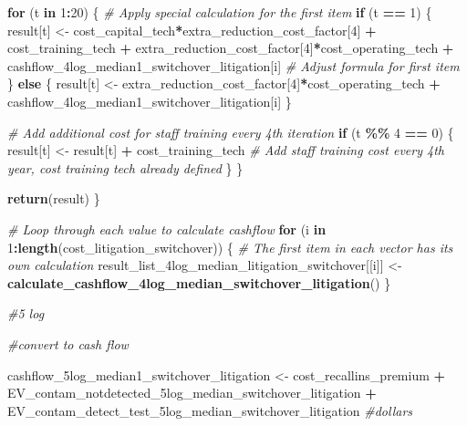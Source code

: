 \documentclass[
]{article}
\newenvironment{Shaded}{\begin{snugshade}}{\end{snugshade}}
\newcommand{\CommentTok}[1]{\textcolor[rgb]{0.56,0.35,0.01}{\textit{#1}}}
\newcommand{\ControlFlowTok}[1]{\textcolor[rgb]{0.13,0.29,0.53}{\textbf{#1}}}
\newcommand{\DecValTok}[1]{\textcolor[rgb]{0.00,0.00,0.81}{#1}}
\newcommand{\FunctionTok}[1]{\textcolor[rgb]{0.13,0.29,0.53}{\textbf{#1}}}
\newcommand{\NormalTok}[1]{#1}
\newcommand{\OtherTok}[1]{\textcolor[rgb]{0.56,0.35,0.01}{#1}}
\newcommand{\SpecialCharTok}[1]{\textcolor[rgb]{0.81,0.36,0.00}{\textbf{#1}}}
\begin{document}
\begin{Shaded}
\begin{Highlighting}[]
  \ControlFlowTok{for}\NormalTok{ (t }\ControlFlowTok{in} \DecValTok{1}\SpecialCharTok{:}\DecValTok{20}\NormalTok{) \{}
    \CommentTok{\# Apply special calculation for the first item}
    \ControlFlowTok{if}\NormalTok{ (t }\SpecialCharTok{==} \DecValTok{1}\NormalTok{) \{}
\NormalTok{      result[t] }\OtherTok{\textless{}{-}}\NormalTok{ cost\_capital\_tech}\SpecialCharTok{*}\NormalTok{extra\_reduction\_cost\_factor[}\DecValTok{4}\NormalTok{] }\SpecialCharTok{+}\NormalTok{ cost\_training\_tech }\SpecialCharTok{+}\NormalTok{ extra\_reduction\_cost\_factor[}\DecValTok{4}\NormalTok{]}\SpecialCharTok{*}\NormalTok{cost\_operating\_tech }\SpecialCharTok{+}\NormalTok{ cashflow\_4log\_median1\_switchover\_litigation[i] }\CommentTok{\# Adjust formula for first item}
\NormalTok{    \} }\ControlFlowTok{else}\NormalTok{ \{}
\NormalTok{      result[t] }\OtherTok{\textless{}{-}}\NormalTok{ extra\_reduction\_cost\_factor[}\DecValTok{4}\NormalTok{]}\SpecialCharTok{*}\NormalTok{cost\_operating\_tech }\SpecialCharTok{+}\NormalTok{ cashflow\_4log\_median1\_switchover\_litigation[i]}
\NormalTok{    \}}
    
    \CommentTok{\# Add additional cost for staff training every 4th iteration}
    \ControlFlowTok{if}\NormalTok{ (t }\SpecialCharTok{\%\%} \DecValTok{4} \SpecialCharTok{==} \DecValTok{0}\NormalTok{) \{}
\NormalTok{      result[t] }\OtherTok{\textless{}{-}}\NormalTok{ result[t] }\SpecialCharTok{+}\NormalTok{ cost\_training\_tech  }\CommentTok{\# Add staff training cost every 4th year, cost training tech already defined}
\NormalTok{    \}}
\NormalTok{  \}}
  
  \FunctionTok{return}\NormalTok{(result)}
\NormalTok{\}}

\CommentTok{\# Loop through each value to calculate cashflow}
\ControlFlowTok{for}\NormalTok{ (i }\ControlFlowTok{in} \DecValTok{1}\SpecialCharTok{:}\FunctionTok{length}\NormalTok{(cost\_litigation\_switchover)) \{}
  \CommentTok{\# The first item in each vector has its own calculation}
\NormalTok{  result\_list\_4log\_median\_litigation\_switchover[[i]] }\OtherTok{\textless{}{-}} \FunctionTok{calculate\_cashflow\_4log\_median\_switchover\_litigation}\NormalTok{()}
\NormalTok{\}}



\CommentTok{\#5 log }

\CommentTok{\#convert to cash flow}

\NormalTok{cashflow\_5log\_median1\_switchover\_litigation }\OtherTok{\textless{}{-}}\NormalTok{ cost\_recallins\_premium }\SpecialCharTok{+}\NormalTok{ EV\_contam\_notdetected\_5log\_median\_switchover\_litigation }\SpecialCharTok{+}\NormalTok{ EV\_contam\_detect\_test\_5log\_median\_switchover\_litigation }\CommentTok{\#dollars}



\end{Highlighting}
\end{Shaded}
\end{document}
